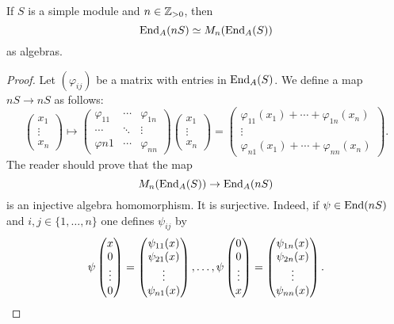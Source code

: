 \begin{lemma}
	\label{lem:simple}
	If $S$ is a simple module and $n\in\mathbb{Z}_{>0}$, then  
	\[
		\operatorname{End}_A(nS)\simeq M_n(\operatorname{End}_A(S))
	\]
	as algebras.
\end{lemma}

\begin{proof}
	Let $(\varphi_{ij})$ be a matrix with entries in $\operatorname{End}_A(S)$. We define a map
	$nS\to nS$ as follows:
	\[
	\begin{pmatrix}
	x_1\\
	\vdots\\
	x_n	
	\end{pmatrix}
	\mapsto 
		\begin{pmatrix}
			\varphi_{11} & \cdots & \varphi_{1n}\\
			\cdots & \ddots & \vdots\\
			\varphi{n1} & \cdots & \varphi_{nn}
		\end{pmatrix}
		\begin{pmatrix}
		x_1\\
		\vdots\\
		x_n	
		\end{pmatrix}
		=\begin{pmatrix}
			\varphi_{11}(x_1)+\cdots+\varphi_{1n}(x_n)\\
			\vdots\\
			\varphi_{n1}(x_1)+\cdots+\varphi_{nn}(x_n)
		\end{pmatrix}.
	\]
	The reader should prove that the map  
	\[
		M_n(\operatorname{End}_A(S))\to\operatorname{End}_A(nS)
	\]
	is an injective algebra homomorphism. 
	It is surjective. Indeed, if $\psi\in\operatorname{End}(nS)$ and 
	$i,j\in\{1,\dots,n\}$ one defines $\psi_{ij}$ by 
	\[
		\psi\begin{pmatrix}
		x\\
		0\\
		\vdots\\
		0	
		\end{pmatrix}
		=\begin{pmatrix}
		\psi_{11}(x)\\
		\psi_{21}(x)\\
		\vdots\\
		\psi_{n1}(x)
		\end{pmatrix},\dots,
		\psi\begin{pmatrix}
		0\\
		0\\
		\vdots\\
		x	
		\end{pmatrix}
		=\begin{pmatrix}
		\psi_{1n}(x)\\
		\psi_{2n}(x)\\
		\vdots\\
		\psi_{nn}(x)
		\end{pmatrix}.\qedhere
	\]
\end{proof}

